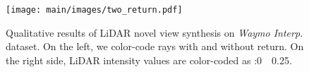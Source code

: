 \begin{figure}[t]
    \centering
        \texttt{[image: main/images/two\_return.pdf]}
        \caption{Qualitative results of LiDAR novel view synthesis on \textit{Waymo Interp.} dataset. On the left, we color-code rays {\setlength{\fboxsep}{0pt}\colorbox{hit}{with}} and {\setlength{\fboxsep}{0pt}\colorbox{ourgray}{without}} return. On the right side, LiDAR intensity values are color-coded as :0~\coolwarm~0.25.}
    \label{fig:two_return}
\end{figure}